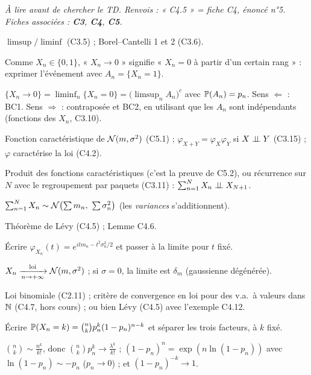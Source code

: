\documentclass[11pt,a4paper]{article}
\begin{document}

\textit{À lire avant de chercher le TD. Renvois : « C4.5 » = fiche C4, énoncé n°5. Fiches associées : \textbf{C3}, \textbf{C4}, \textbf{C5}.}

\begin{exo}
\outils $\limsup/\liminf$ (C3.5) ; Borel--Cantelli 1 et 2 (C3.6).

\meth Comme $X_n\in\{0,1\}$, « $X_n\to0$ » signifie « $X_n=0$ à partir d'un certain rang » : exprimer l'événement avec $A_n=\{X_n=1\}$.

\indic $\{X_n\to0\}=\liminf_n\{X_n=0\}=\bigl(\limsup_n A_n\bigr)^c$ avec $\mathbb{P}(A_n)=p_n$. Sens $\Leftarrow$ : BC1. Sens $\Rightarrow$ : contraposée
et BC2, en utilisant que les $A_n$ sont indépendants (fonctions des $X_n$, C3.10).
\end{exo}

\begin{exo}
\outils Fonction caractéristique de $\mathcal{N}(m,\sigma^2)$ (C5.1) ; $\varphi_{X+Y}=\varphi_X\varphi_Y$ si $X\perp\!\!\!\perp Y$ (C3.15) ; $\varphi$ caractérise la loi (C4.2).

\meth Produit des fonctions caractéristiques (c'est la preuve de C5.2), ou récurrence sur $N$ avec le regroupement par paquets (C3.11) :
$\sum_{n=1}^{N}X_n\perp\!\!\!\perp X_{N+1}$.

\rep $\sum_{n=1}^NX_n\sim\Nc\bigl(\sum m_n,\ \sum\sigma_n^2\bigr)$ (les \emph{variances} s'additionnent).
\end{exo}

\begin{exo}
\outils Théorème de Lévy (C4.5) ; Lemme C4.6.

\meth Écrire $\varphi_{X_n}(t)=e^{itm_n-t^2\sigma_n^2/2}$ et passer à la limite pour $t$ fixé.

\rep $X_n\xrightarrow[n\to+\infty]{\text{loi}}\mathcal{N}(m,\sigma^2)$ ; si $\sigma=0$, la limite est $\delta_m$ (gaussienne dégénérée).
\end{exo}

\begin{exo}
\outils Loi binomiale (C2.11) ; critère de convergence en loi pour des v.a.\ à valeurs dans $\mathbb{N}$ (C4.7, hors cours) ; ou bien Lévy (C4.5)
avec l'exemple C4.12.

\meth Écrire $\mathbb{P}(X_n=k)=\binom nkp_n^k(1-p_n)^{n-k}$ et séparer les trois facteurs, à $k$ fixé.

\indic $\binom nk\sim\frac{n^k}{k!}$, donc $\binom nkp_n^k\to\frac{\lambda^k}{k!}$ ; $(1-p_n)^{n}=\exp(n\ln(1-p_n))$ avec $\ln(1-p_n)\sim-p_n$
($p_n\to0$) ; et $(1-p_n)^{-k}\to1$.
\end{exo}
\end{document}
